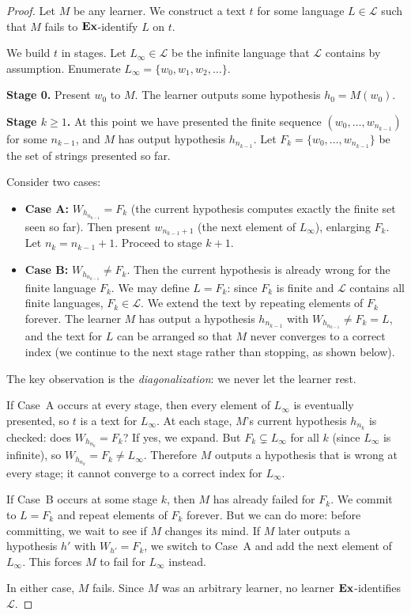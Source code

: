 \begin{proof}
Let $M$ be any learner. We construct a text $t$ for some language $L \in \mathcal{L}$ such that $M$ fails to $\mathbf{Ex}$-identify $L$ on $t$.

We build $t$ in stages. Let $L_\infty \in \mathcal{L}$ be the infinite language that $\mathcal{L}$ contains by assumption. Enumerate $L_\infty = \{w_0, w_1, w_2, \ldots\}$.

\medskip
\noindent\textbf{Stage 0.} Present $w_0$ to $M$. The learner outputs some hypothesis $h_0 = M(w_0)$.

\medskip
\noindent\textbf{Stage $k \geq 1$.} At this point we have presented the finite sequence $(w_0, \ldots, w_{n_{k-1}})$ for some $n_{k-1}$, and $M$ has output hypothesis $h_{n_{k-1}}$. Let $F_k = \{w_0, \ldots, w_{n_{k-1}}\}$ be the set of strings presented so far.

Consider two cases:
\begin{itemize}[leftmargin=*]
\item \textbf{Case A:} $W_{h_{n_{k-1}}} = F_k$ (the current hypothesis computes exactly the finite set seen so far). Then present $w_{n_{k-1}+1}$ (the next element of $L_\infty$), enlarging $F_k$. Let $n_k = n_{k-1} + 1$. Proceed to stage $k+1$.

\item \textbf{Case B:} $W_{h_{n_{k-1}}} \neq F_k$. Then the current hypothesis is already wrong for the finite language $F_k$. We may define $L = F_k$: since $F_k$ is finite and $\mathcal{L}$ contains all finite languages, $F_k \in \mathcal{L}$. We extend the text by repeating elements of $F_k$ forever. The learner $M$ has output a hypothesis $h_{n_{k-1}}$ with $W_{h_{n_{k-1}}} \neq F_k = L$, and the text for $L$ can be arranged so that $M$ never converges to a correct index (we continue to the next stage rather than stopping, as shown below).
\end{itemize}

The key observation is the \emph{diagonalization}: we never let the learner rest.

If Case~A occurs at every stage, then every element of $L_\infty$ is eventually presented, so $t$ is a text for $L_\infty$. At each stage, $M$'s current hypothesis $h_{n_k}$ is checked: does $W_{h_{n_k}} = F_k$? If yes, we expand. But $F_k \subsetneq L_\infty$ for all $k$ (since $L_\infty$ is infinite), so $W_{h_{n_k}} = F_k \neq L_\infty$. Therefore $M$ outputs a hypothesis that is wrong at every stage; it cannot converge to a correct index for $L_\infty$.

If Case~B occurs at some stage $k$, then $M$ has already failed for $F_k$. We commit to $L = F_k$ and repeat elements of $F_k$ forever. But we can do more: before committing, we wait to see if $M$ changes its mind. If $M$ later outputs a hypothesis $h'$ with $W_{h'} = F_k$, we switch to Case~A and add the next element of $L_\infty$. This forces $M$ to fail for $L_\infty$ instead.

In either case, $M$ fails. Since $M$ was an arbitrary learner, no learner $\mathbf{Ex}$-identifies $\mathcal{L}$.
\end{proof}


